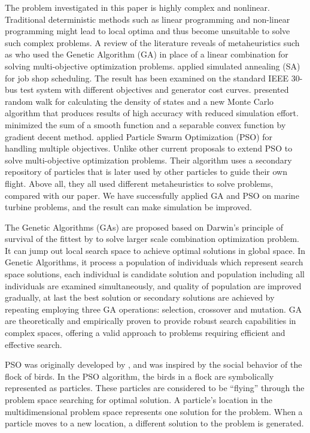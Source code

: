 The problem investigated in this paper is highly complex and nonlinear. Traditional deterministic methods such as linear programming and non-linear programming might lead to local optima and thus become unsuitable to solve such complex problems. A review of the literature reveals of metaheuristics such as  \cite{rey1994niched} who used the Genetic Algorithm (GA) in place of a linear combination for solving multi-objective optimization problems. \cite{van1992job} applied simulated annealing (SA) for job shop scheduling. The result has been examined on the standard IEEE 30-bus test system with different objectives and generator cost curves. \cite{wang2001efficient} presented random walk for calculating the density of states and a new Monte Carlo algorithm that produces results of high accuracy with reduced simulation effort. \cite{tseng2009coordinate} minimized the sum of a smooth function and a separable convex function by gradient decent method. \cite{coello2004handling} applied Particle Swarm Optimization (PSO) for handling multiple objectives. Unlike other current proposals to extend PSO to solve multi-objective optimization problems. Their algorithm uses a secondary repository of particles that is later used by other particles to guide their own flight. Above all, they all used different metaheuristics to solve problems, compared with our paper. We have successfully applied GA and PSO on marine turbine problems, and the result can make simulation be improved. 

The Genetic Algorithms (GAs) are proposed based on Darwin's principle of survival of the fittest by \cite{holland1992genetic} to solve larger scale combination optimization problem. It can jump out local search space to achieve optimal solutions in global space. In Genetic Algorithms, it process a population of individuals which represent search space solutions, each individual is candidate solution and population including all individuals are examined simultaneously, and quality of population are improved gradually, at last the best solution or secondary solutions are achieved by repeating employing three GA operations: selection, crossover and mutation. GA are theoretically and empirically proven to provide robust search capabilities in complex spaces, offering a valid approach to problems requiring efficient and effective search.

PSO was originally developed by \cite{kennedy2010particle}, and was inspired by the social behavior of the flock of birds. In the PSO algorithm, the birds in a flock are symbolically represented as particles. These particles are considered to be “flying” through the problem space searching for optimal solution. A particle's location in the multidimensional problem space represents one solution for the problem. When a particle moves to a new location, a different solution to the problem is generated.

